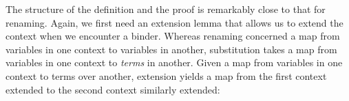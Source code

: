 The structure of the definition and the proof is remarkably close to
that for renaming. Again, we first need an extension lemma that allows
us to extend the context when we encounter a binder. Whereas renaming
concerned a map from variables in one context to variables in another,
substitution takes a map from variables in one context to \emph{terms}
in another. Given a map from variables in one context to terms over
another, extension yields a map from the first context extended to the
second context similarly extended:

\begin{fence}
\begin{code}%
\>[0]\AgdaSpace{}%
\AgdaSymbol{:}\AgdaSpace{}%
\AgdaSpace{}%
\AgdaSymbol{\{}\AgdaSpace{}%
\AgdaSymbol{\}}\<%
\\
\>[0][@{}l@{\AgdaIndent{0}}]%
\>[2]%
\>[772I]\AgdaSpace{}%
\AgdaSymbol{\{}\AgdaSymbol{\}}\AgdaSpace{}%
%
\>[19]\AgdaSpace{}%
\AgdaSpace{}%
\AgdaSpace{}%
%
\>[31]\AgdaSpace{}%
\AgdaSpace{}%
\AgdaSymbol{)}\<%
\\
\>[.][@{}l@{}]\<[772I]%
\>[4]\AgdaComment{---------------------------------}\<%
\\
%
\>[2]\AgdaSpace{}%
\AgdaSpace{}%
\AgdaSymbol{\{}\AgdaSpace{}%
\AgdaSymbol{\}}\AgdaSpace{}%
\AgdaSpace{}%
\AgdaSpace{}%
\AgdaOperator{\AgdaInductiveConstructor{,}}\AgdaSpace{}%
\AgdaSpace{}%
\AgdaSpace{}%
\AgdaSpace{}%
\AgdaSpace{}%
\AgdaSpace{}%
\AgdaOperator{\AgdaInductiveConstructor{,}}\AgdaSpace{}%
\AgdaSpace{}%
\AgdaSpace{}%
\AgdaSymbol{)}\<%
\\
\>[0]\AgdaSpace{}%
\AgdaSpace{}%
%
\>[14]\AgdaSymbol{=}%
\>[17]\AgdaSpace{}%
\<%
\\
\>[0]\AgdaSpace{}%
\AgdaSpace{}%
\AgdaSymbol{(}\AgdaSpace{}%
\AgdaSymbol{)}%
\>[14]\AgdaSymbol{=}%
\>[17]\AgdaSpace{}%
\AgdaSpace{}%
\AgdaSymbol{(}\AgdaSpace{}%
\AgdaSymbol{)}\<%
\end{code}
\end{fence}


